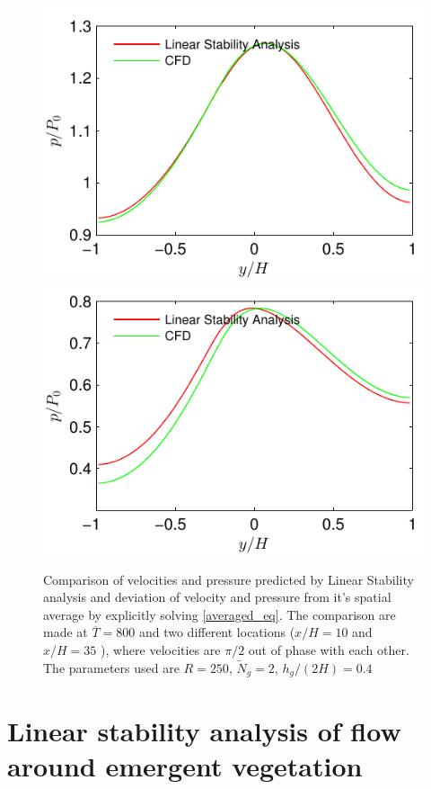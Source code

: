 \documentclass[12pt]{report}   %
\newcommand{\Ndg}{\tilde{N}_g}
\renewcommand{\bar}{\overline}
\begin{document}
\begin{figure}
\centerline{\includegraphics{LinearStabilityVsCFD_Saturated_p_phase0} \includegraphics{LinearStabilityVsCFD_Saturated_p_phase90}}
\caption{Comparison of velocities and pressure predicted by Linear Stability analysis and deviation of velocity and pressure from it's spatial average by explicitly solving \eqref{averaged_eq}. The comparison are made at $\bar{T}=800$ and two different locations ($x/H=10$ and $x/H=35$ ), where velocities are $\pi/2$ out of phase with each other. The parameters used are $R=250$, $\Ndg=2$, $h_g/(2H)=0.4$ }
\label{CFDVsLinearStabilitySaturated}
\end{figure}


\chapter{Linear stability analysis of flow around emergent vegetation}
\end{document}
